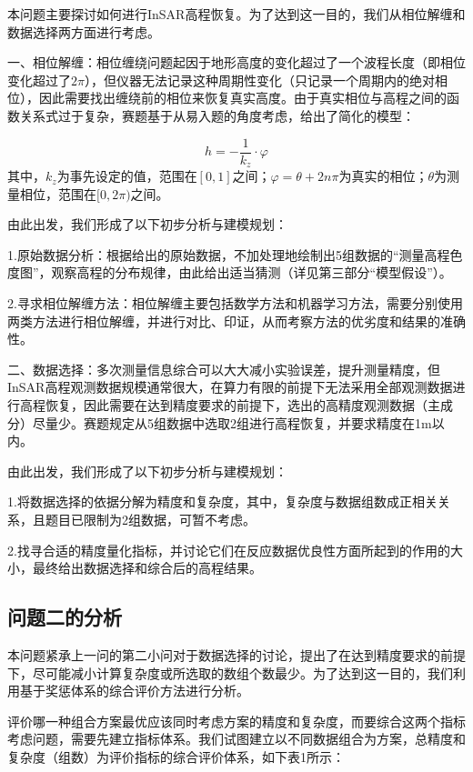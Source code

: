 \documentclass[a4paper]{article}
\begin{document}
	本问题主要探讨如何进行InSAR高程恢复。为了达到这一目的，我们从相位解缠和数据选择两方面进行考虑。\par
	一、相位解缠：相位缠绕问题起因于地形高度的变化超过了一个波程长度（即相位变化超过了$ 2\pi $），但仪器无法记录这种周期性变化（只记录一个周期内的绝对相位），因此需要找出缠绕前的相位来恢复真实高度。由于真实相位与高程之间的函数关系式过于复杂，赛题基于从易入题的角度考虑，给出了简化的模型：\par
	\begin{equation}
		h = -\frac{1}{k_z} \cdot \varphi
	\end{equation}
	其中，$ k_z $为事先设定的值，范围在$ [0,1] $之间；$ \varphi = \theta + 2n\pi $为真实的相位；$ \theta $为测量相位，范围在$ [0,2\pi) $之间。\par
	由此出发，我们形成了以下初步分析与建模规划：\par
	1.原始数据分析：根据给出的原始数据，不加处理地绘制出5组数据的“测量高程色度图”，观察高程的分布规律，由此给出适当猜测（详见第三部分“模型假设”）。\par
	2.寻求相位解缠方法：相位解缠主要包括数学方法和机器学习方法，需要分别使用两类方法进行相位解缠，并进行对比、印证，从而考察方法的优劣度和结果的准确性。\par
	二、数据选择：多次测量信息综合可以大大减小实验误差，提升测量精度，但InSAR高程观测数据规模通常很大，在算力有限的前提下无法采用全部观测数据进行高程恢复，因此需要在达到精度要求的前提下，选出的高精度观测数据（主成分）尽量少。赛题规定从5组数据中选取2组进行高程恢复，并要求精度在1m以内。\par
	由此出发，我们形成了以下初步分析与建模规划：\par
	1.将数据选择的依据分解为精度和复杂度，其中，复杂度与数据组数成正相关关系，且题目已限制为2组数据，可暂不考虑。\par
	2.找寻合适的精度量化指标，并讨论它们在反应数据优良性方面所起到的作用的大小，最终给出数据选择和综合后的高程结果。\par

	\subsection{问题二的分析}

	本问题紧承上一问的第二小问对于数据选择的讨论，提出了在达到精度要求的前提下，尽可能减小计算复杂度或所选取的数组个数最少。为了达到这一目的，我们利用基于奖惩体系的综合评价方法进行分析。\par
	评价哪一种组合方案最优应该同时考虑方案的精度和复杂度，而要综合这两个指标考虑问题，需要先建立指标体系。我们试图建立以不同数据组合为方案，总精度和复杂度（组数）为评价指标的综合评价体系，如下表1所示：\par
	
\end{document}
